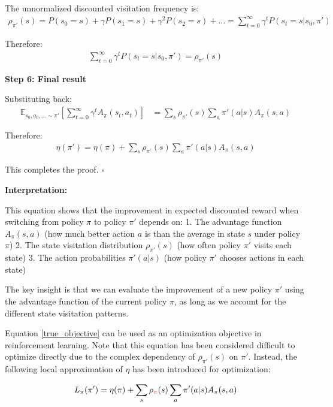 The unnormalized discounted visitation frequency is:
\begin{align}
\rho_{\pi'}(s) = P(s_0 = s) + \gamma P(s_1 = s) + \gamma^2 P(s_2 = s) + \ldots = \sum_{t = 0}^{\infty} \gamma^t P(s_t = s | s_0, \pi')
\end{align}

Therefore:
\begin{align}
\sum_{t = 0}^{\infty} \gamma^t P(s_t = s | s_0, \pi') = \rho_{\pi'}(s)
\end{align}

\textbf{Step 6: Final result}

Substituting back:
\begin{align}
\mathbb{E}_{s_{0}, a_{0}, \ldots \sim \pi'} \left[ \sum_{t = 0}^{\infty} \gamma^t A_\pi(s_t, a_t) \right] &= \sum_{s} \rho_{\pi'}(s) \sum_{a} \pi'(a | s) A_\pi(s, a)
\end{align}

Therefore:
\begin{align}
\eta(\pi') = \eta(\pi) + \sum_{s}\rho_{\pi'}(s)\sum_{a}\pi'(a|s)A_{\pi}(s, a)
\end{align}

This completes the proof. $\square$

\textbf{Interpretation:}

This equation shows that the improvement in expected discounted reward when switching from policy $\pi$ to policy $\pi'$ depends on:
1. The advantage function $A_\pi(s,a)$ (how much better action $a$ is than the average in state $s$ under policy $\pi$)
2. The state visitation distribution $\rho_{\pi'}(s)$ (how often policy $\pi'$ visits each state)
3. The action probabilities $\pi'(a|s)$ (how policy $\pi'$ chooses actions in each state)

The key insight is that we can evaluate the improvement of a new policy $\pi'$ using the advantage function of the current policy $\pi$, as long as we account for the different state visitation patterns.

Equation \ref{true_objective} can be used as an optimization objective in reinforcement learning. Note that this equation has been considered difficult to optimize directly due to the complex dependency of $\rho_{\pi'}(s)$ on $\pi'$. Instead, the following local approximation of $\eta$ has been introduced for optimization:

\begin{align}\label{approx_objective}
    L_{\pi}(\pi') = \eta(\pi) + \sum_{s}\rho_{\textcolor{red}{\pi}}(s)\sum_{a}\pi'(a|s)A_{\pi}(s, a)
\end{align}

